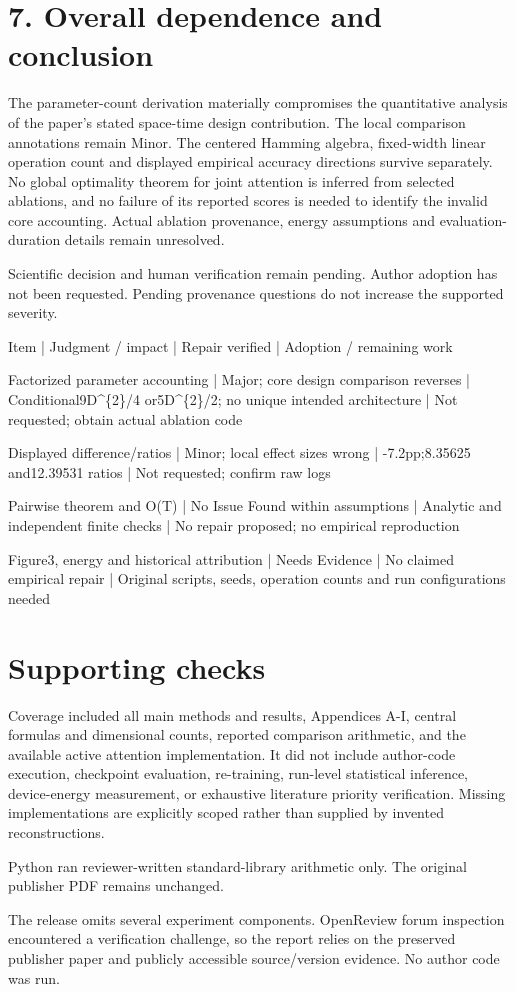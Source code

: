 \documentclass[10pt]{article}
\begin{document}
\section*{7. Overall dependence and conclusion}
The parameter-count derivation materially compromises the quantitative analysis of the paper’s stated space-time design contribution. The local comparison annotations remain Minor. The centered Hamming algebra, fixed-width linear operation count and displayed empirical accuracy directions survive separately. No global optimality theorem for joint attention is inferred from selected ablations, and no failure of its reported scores is needed to identify the invalid core accounting. Actual ablation provenance, energy assumptions and evaluation-duration details remain unresolved.\par
Scientific decision and human verification remain pending. Author adoption has not been requested. Pending provenance questions do not increase the supported severity.\par
Item | Judgment / impact | Repair verified | Adoption / remaining work\par
Factorized parameter accounting | Major; core design comparison reverses | Conditional9D\textasciicircum{}\{2\}/4 or5D\textasciicircum{}\{2\}/2; no unique intended architecture | Not requested; obtain actual ablation code\par
Displayed difference/ratios | Minor; local effect sizes wrong | -7.2pp;8.35625 and12.39531 ratios | Not requested; confirm raw logs\par
Pairwise theorem and O(T) | No Issue Found within assumptions | Analytic and independent finite checks | No repair proposed; no empirical reproduction\par
Figure3, energy and historical attribution | Needs Evidence | No claimed empirical repair | Original scripts, seeds, operation counts and run configurations needed\par
\section*{Supporting checks}
Coverage included all main methods and results, Appendices A-I, central formulas and dimensional counts, reported comparison arithmetic, and the available active attention implementation. It did not include author-code execution, checkpoint evaluation, re-training, run-level statistical inference, device-energy measurement, or exhaustive literature priority verification. Missing implementations are explicitly scoped rather than supplied by invented reconstructions.\par
Python ran reviewer-written standard-library arithmetic only. The original publisher PDF remains unchanged.\par
The release omits several experiment components. OpenReview forum inspection encountered a verification challenge, so the report relies on the preserved publisher paper and publicly accessible source/version evidence. No author code was run.\par
\end{document}
